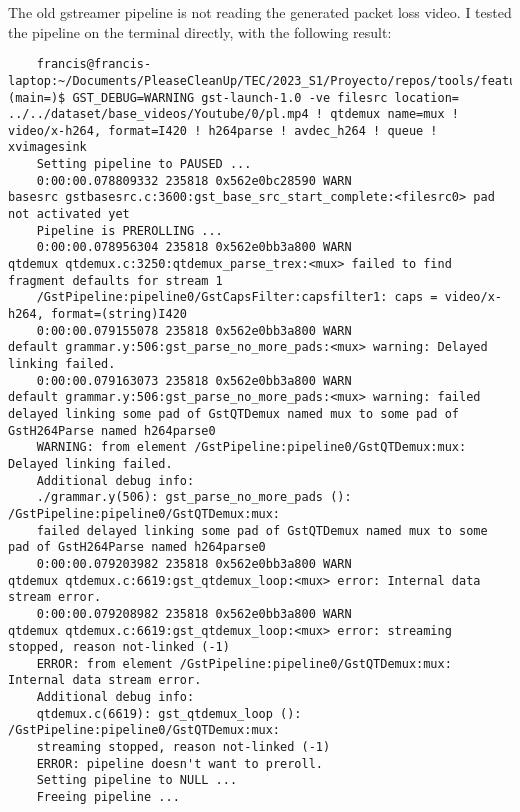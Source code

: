 \documentclass[12pt,oneside]{book}
\begin{document}
  The old gstreamer pipeline is not reading the generated packet loss video.
  I tested the pipeline on the terminal directly, with the following result:
  \begin{lstlisting}
    francis@francis-laptop:~/Documents/PleaseCleanUp/TEC/2023_S1/Proyecto/repos/tools/feature_generator (main=)$ GST_DEBUG=WARNING gst-launch-1.0 -ve filesrc location= ../../dataset/base_videos/Youtube/0/pl.mp4 ! qtdemux name=mux ! video/x-h264, format=I420 ! h264parse ! avdec_h264 ! queue ! xvimagesink
    Setting pipeline to PAUSED ...
    0:00:00.078809332 235818 0x562e0bc28590 WARN                 basesrc gstbasesrc.c:3600:gst_base_src_start_complete:<filesrc0> pad not activated yet
    Pipeline is PREROLLING ...
    0:00:00.078956304 235818 0x562e0bb3a800 WARN                 qtdemux qtdemux.c:3250:qtdemux_parse_trex:<mux> failed to find fragment defaults for stream 1
    /GstPipeline:pipeline0/GstCapsFilter:capsfilter1: caps = video/x-h264, format=(string)I420
    0:00:00.079155078 235818 0x562e0bb3a800 WARN                 default grammar.y:506:gst_parse_no_more_pads:<mux> warning: Delayed linking failed.
    0:00:00.079163073 235818 0x562e0bb3a800 WARN                 default grammar.y:506:gst_parse_no_more_pads:<mux> warning: failed delayed linking some pad of GstQTDemux named mux to some pad of GstH264Parse named h264parse0
    WARNING: from element /GstPipeline:pipeline0/GstQTDemux:mux: Delayed linking failed.
    Additional debug info:
    ./grammar.y(506): gst_parse_no_more_pads (): /GstPipeline:pipeline0/GstQTDemux:mux:
    failed delayed linking some pad of GstQTDemux named mux to some pad of GstH264Parse named h264parse0
    0:00:00.079203982 235818 0x562e0bb3a800 WARN                 qtdemux qtdemux.c:6619:gst_qtdemux_loop:<mux> error: Internal data stream error.
    0:00:00.079208982 235818 0x562e0bb3a800 WARN                 qtdemux qtdemux.c:6619:gst_qtdemux_loop:<mux> error: streaming stopped, reason not-linked (-1)
    ERROR: from element /GstPipeline:pipeline0/GstQTDemux:mux: Internal data stream error.
    Additional debug info:
    qtdemux.c(6619): gst_qtdemux_loop (): /GstPipeline:pipeline0/GstQTDemux:mux:
    streaming stopped, reason not-linked (-1)
    ERROR: pipeline doesn't want to preroll.
    Setting pipeline to NULL ...
    Freeing pipeline ...\end{lstlisting}
  
\end{document}
